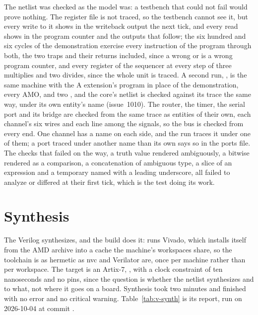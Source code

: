 \documentclass[journal,onecolumn,9pt]{IEEEtran}
\begin{document}
The netlist was checked as the model was: a testbench that could not
fail would prove nothing. The register file is not traced, so the
testbench cannot see it, but every write to it shows in the
writeback output the next tick, and every read shows in the program
counter and the outputs that follow; the six hundred and six
cycles of the demonstration exercise every instruction of
the program through both, the two traps and their returns included,
since a wrong  or  is a wrong program
counter, and every register of the sequencer at every step of three
multiplies and two divides, since the whole unit is traced. A second
run, , is the same machine with the A extension's
program in place of the demonstration, every AMO,  and two
, and the core's netlist is checked against its trace the
same way, under its own entity's name (issue~1010). The
router, the timer, the serial port and its bridge are checked from
the same trace as entities of their own, each channel's six wires and each
line among the signals, so the bus is checked from every end. One
channel has a name on each side, and the run traces it under one of
them; a port traced under another name than its own says so in the
ports file. The checks that failed on the way, a truth value rendered
ambiguously, a bitwise  rendered as a comparison, a
concatenation of ambiguous type, a slice of an expression and a
temporary named with a leading underscore, all failed to analyze or
differed at their first tick, which is the test doing its work.

\section{Synthesis}
\label{sec:v-synth}

The Verilog synthesizes, and the build does it:  runs Vivado, which 
installs itself from the AMD archive into a cache the machine's
workspaces share, so the toolchain is as hermetic as nvc and
Verilator are, once per machine rather than per workspace. The target
is an Artix-7, , with a clock constraint of
ten nanoseconds and no pins, since the question is whether the
netlist synthesizes and to what, not where it goes on a board.
Synthesis took two minutes and finished with no error and no
critical warning. Table~\ref{tab:v-synth} is its report, run on
2026-10-04 at commit .
\end{document}
